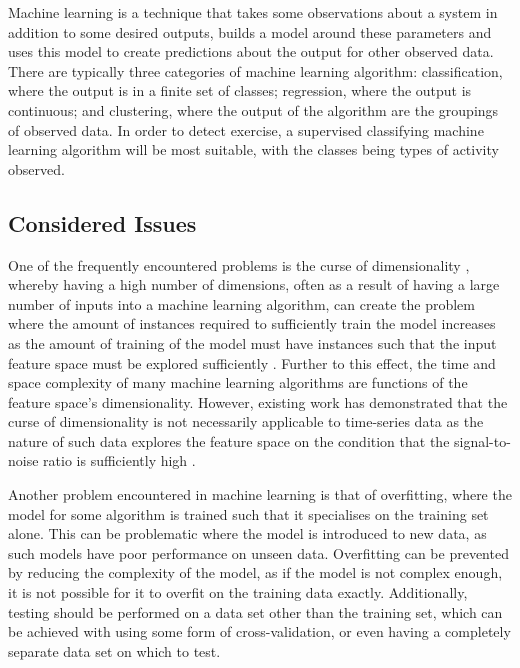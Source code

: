 \label{ml}

Machine learning is a technique that takes some observations about a system in addition to some desired outputs, builds a model around these parameters and uses this model to create predictions about the output for other observed data. There are typically three categories of machine learning algorithm: classification, where the output is in a finite set of classes; regression, where the output is continuous; and clustering, where the output of the algorithm are the groupings of observed data. In order to detect exercise, a supervised classifying machine learning algorithm will be most suitable, with the classes being types of activity observed.

\subsection{Considered Issues}

One of the frequently encountered problems is the curse of dimensionality \cite{bellman1957dynamic}, whereby having a high number of dimensions, often as a result of having a large number of inputs into a machine learning algorithm, can create the problem where the amount of instances required to sufficiently train the model increases as the amount of training of the model must have instances such that the input feature space must be explored sufficiently \cite{oommen2008objective}. Further to this effect, the time and space complexity of many machine learning algorithms are functions of the feature space's dimensionality. However, existing work has demonstrated that the curse of dimensionality is not necessarily applicable to time-series data as the nature of such data explores the feature space on the condition that the signal-to-noise ratio is sufficiently high \cite{bernecker2011quality}.

Another problem encountered in machine learning is that of overfitting, where the model for some algorithm is trained such that it specialises on the training set alone. This can be problematic where the model is introduced to new data, as such models have poor performance on unseen data. Overfitting can be prevented by reducing the complexity of the model, as if the model is not complex enough, it is not possible for it to overfit on the training data exactly. Additionally, testing should be performed on a data set other than the training set, which can be achieved with using some form of cross-validation, or even having a completely separate data set on which to test.

